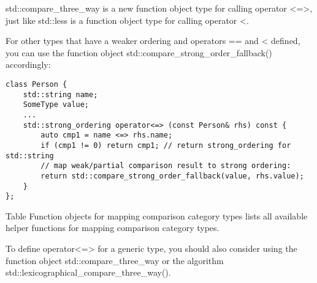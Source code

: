 std::compare\_three\_way is a new function object type for calling operator <=>, just like std::less is a function object type for calling operator <.

For other types that have a weaker ordering and operators == and < defined, you can use the function object std::compare\_strong\_order\_fallback() accordingly:

\begin{lstlisting}[style=styleCXX]
class Person {
	std::string name;
	SomeType value;
	...
	std::strong_ordering operator<=> (const Person& rhs) const {
		auto cmp1 = name <=> rhs.name;
		if (cmp1 != 0) return cmp1; // return strong_ordering for std::string
		// map weak/partial comparison result to strong ordering:
		return std::compare_strong_order_fallback(value, rhs.value);
	}
};
\end{lstlisting}

Table Function objects for mapping comparison category types lists all available helper functions for mapping comparison category types.

To define operator<=> for a generic type, you should also consider using the function object std::compare\_three\_way or the algorithm std::lexicographical\_compare\_three\_way().
